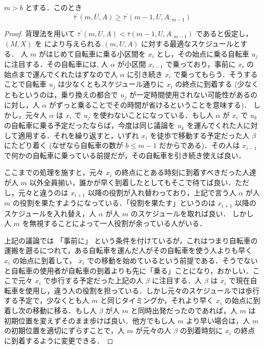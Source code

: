 \begin{lemma}\label{lemma:fsabs-lower-bound-recursive}
  $m > b$ とする．このとき
  \begin{equation}
    \bar\tau^{\prime}(m, U, A) \geq \bar\tau^\prime(m - 1, U, A_{:m-1})
  \end{equation}
\end{lemma}
\begin{proof}
  背理法を用いて $\bar\tau^{\prime}(m, U, A) < \bar\tau(m - 1, U, A_{:m-1})$ であると仮定し，$(M, X)$ を により与えられる $(m, U, A)$ に対する最適なスケジュールとする．
  人 $m$ がはじめて自転車に乗る小区間を $x_i$ とし，その始点に乗る自転車 $u_j$ に注目する．その自転車には,
  人 $\alpha$ が小区間 $x_{i - 1}$ で乗っており，事前に $x_i$ の始点まで運んでくれたはずなので人 $\alpha$ に引き続き $x_i$ で乗ってもらう．そうすることで自転車 $u_j$ は少なくともスケジュール通りに $x_i$ の終点に到着する (少なくともというのは，乗り換えの都合で $u_j$ が一定時間使用されない可能性があるのに対し，人 $\alpha$ がずっと乗ることでその時間が省けるということを意味する)． しかし，元々人 $\alpha$ は $x_i$ で $u_j$ を使わないことになっている．もし人 $\alpha$ が $x_i$ で $u_k$ の自転車に乗る予定だったならば，今度は同じ議論を $u_k$ を運んでくれた人に対して適用する．それを繰り返すと，いずれ $x_i$ を徒歩で移動する予定だった人 $\beta$ にたどり着く (なぜなら自転車の数が $b \leq m - 1$ だからである)．その人は $x_{i - 1}$ で何かの自転車に乗っている前提だが，その自転車を引き続き使えば良い．

ここまでの処理を施すと，元々 $x_i$ の終点にとある時刻に到着すべきだった人達が人 $m$ 以外全員揃い，誰かが早く到着したとしてもそこで待てば良い．ただし，元々と違うのは $x_{i + 1}$ 以降の役割が入れ替わっており，上記で言う人 $\alpha$ が人 $m$ の役割を果たすようになっている．「役割を果たす」というのは $x_{i + 1}$ 以降のスケジュールを入れ替え，人 $\alpha$ が人 $m$ のスケジュールを取れば良い． しかし人 $m$ を無視することによって一人役割が余っている人がいる．

上記の議論では 「事前に」 という条件を付けているが，これはつまり自転車の運搬を遡るにつれて，ある自転車を運んだ人がその自転車を使う人よりも早く $x_i$ の始点に到着して， $x_i$ での移動を始めているという前提である．そうでないと自転車の使用者が自転車の到着よりも先に「乗る」ことになり，おかしい．ここで元々 $x_i$ で歩行する予定だった上記の人 $\beta$ に注目する．人 $\beta$ は $x_i$ で現在自転車を使用し，違う人の役割を担っている．しかし元々のスケジュールでは歩行する予定で，少なくとも人 $m$ と同じタイミングか，それより早く $x_i$ の始点に到着し次の移動に移る．もし人 $\beta$ が人 $m$ と同時出発だったのであれば，人 $m$ は初期位置を変えずそのまま歩けば良い．他方でもし人 $m$ より早い場合は，人 $m$ の初期位置を適切にずらすことで，人 $m$ が元々の人 $\beta$ の到着時刻に $x_i$ の終点に到着するように変更できる．


\end{proof}

